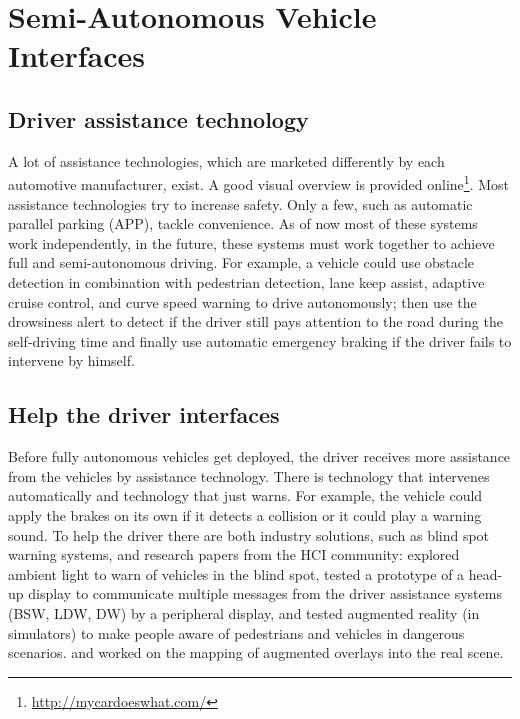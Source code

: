 \section{Semi-Autonomous Vehicle Interfaces}
\subsection{Driver assistance technology}
A lot of assistance technologies, which are marketed differently by each automotive manufacturer, exist. A good visual overview is provided online\footnote{\url{http://mycardoeswhat.com/}}. Most assistance technologies try to increase safety. Only a few, such as automatic parallel parking (APP), tackle convenience. As of now most of these systems work independently, in the future, these systems must work together to achieve full and semi-autonomous driving. For example, a vehicle could use obstacle detection in combination with pedestrian detection, lane keep assist, adaptive cruise control, and curve speed warning to drive autonomously; then use the drowsiness alert to detect if the driver still pays attention to the road during the self-driving time and finally use automatic emergency braking if the driver fails to intervene by himself. 

\subsection{Help the driver interfaces}
Before fully autonomous vehicles get deployed, the driver receives more assistance from the vehicles by assistance technology. There is technology that intervenes automatically and technology that just warns. For example, the vehicle could apply the brakes on its own if it detects a collision or it could play a warning sound. To help the driver there are both industry solutions, such as blind spot warning systems, and research papers from the HCI community:  \citet{Loecken2015} explored ambient light to warn of vehicles in the blind spot, \citet{Langlois2013} tested a prototype of a head-up display to communicate multiple messages from the driver assistance systems (BSW, LDW, DW) by a peripheral display, \citet{Kim} and \citet{Langlois2016} tested augmented reality (in simulators) to make people aware of pedestrians and vehicles in dangerous scenarios. 
\citet{Larnaout2013} and \citet{Abdi} worked on the mapping of augmented overlays into the real scene. 

